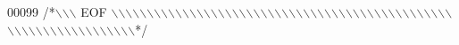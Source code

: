 \begin{DoxyCode}
00099 \textcolor{comment}{/*\(\backslash\)\(\backslash\)\(\backslash\) EOF \(\backslash\)\(\backslash\)\(\backslash\)\(\backslash\)\(\backslash\)\(\backslash\)\(\backslash\)\(\backslash\)\(\backslash\)\(\backslash\)\(\backslash\)\(\backslash\)\(\backslash\)\(\backslash\)\(\backslash\)\(\backslash\)\(\backslash\)\(\backslash\)\(\backslash\)\(\backslash\)\(\backslash\)\(\backslash\)\(\backslash\)\(\backslash\)\(\backslash\)\(\backslash\)\(\backslash\)\(\backslash\)\(\backslash\)\(\backslash\)\(\backslash\)\(\backslash\)\(\backslash\)\(\backslash\)\(\backslash\)\(\backslash\)\(\backslash\)\(\backslash\)\(\backslash\)\(\backslash\)\(\backslash\)\(\backslash\)\(\backslash\)\(\backslash\)\(\backslash\)\(\backslash\)\(\backslash\)\(\backslash\)\(\backslash\)\(\backslash\)\(\backslash\)\(\backslash\)\(\backslash\)\(\backslash\)\(\backslash\)\(\backslash\)\(\backslash\)\(\backslash\)\(\backslash\)\(\backslash\)\(\backslash\)\(\backslash\)\(\backslash\)\(\backslash\)\(\backslash\)\(\backslash\)*/}
\end{DoxyCode}
